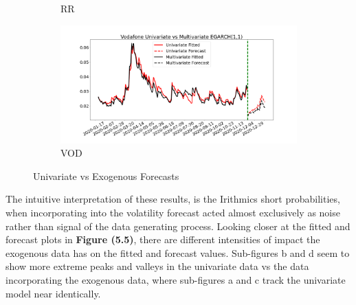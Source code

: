 \begin{figure}[H]
\begin{subfigure}{.49\linewidth}
  \caption{RR}
  \label{fig:C}
\end{subfigure} %
\begin{subfigure}{.49\linewidth}
  \includegraphics[width=\linewidth]{images/multiGarch/plot 4.png}
  \caption{VOD}
  \label{fig:D}
\end{subfigure}
\caption{Univariate vs Exogenous Forecasts}
\end{figure}

The intuitive interpretation of these results, is the Irithmics short probabilities, when incorporating into the volatility forecast acted almost exclusively as noise rather than signal of the data generating process. Looking closer at the fitted and forecast plots in \textbf{Figure (5.5)}, there are different intensities of impact the exogenous data has on the fitted and forecast values. Sub-figures b and d seem to show more extreme peaks and valleys in the univariate data vs the data incorporating the exogenous data, where sub-figures a and c track the univariate model near identically.